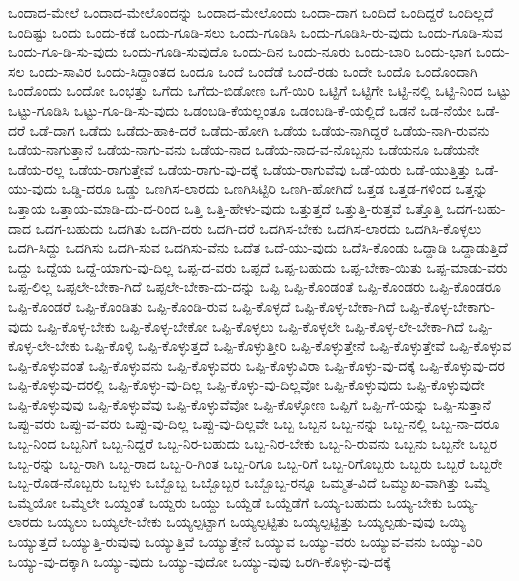 {ಒಂದಾದ-ಮೇಲೆ
ಒಂದಾದ-ಮೇಲೊಂದನ್ನು
ಒಂದಾದ-ಮೇಲೊಂದು
ಒಂದಾ-ದಾಗ
ಒಂದಿದೆ
ಒಂದಿದ್ದರೆ
ಒಂದಿಲ್ಲದೆ
ಒಂದಿಷ್ಟು
ಒಂದು
ಒಂದು-ಕಡೆ
ಒಂದು-ಗೂಡಿ-ಸಲು
ಒಂದು-ಗೂಡಿಸಿ
ಒಂದು-ಗೂಡಿಸಿ-ರು-ವುದು
ಒಂದು-ಗೂಡಿ-ಸುವ
ಒಂದು-ಗೂ-ಡಿ-ಸು-ವುದು
ಒಂದು-ಗೂಡಿ-ಸುವುದೊ
ಒಂದು-ದಿನ
ಒಂದು-ನೂರು
ಒಂದು-ಬಾರಿ
ಒಂದು-ಭಾಗ
ಒಂದು-ಸಲ
ಒಂದು-ಸಾವಿರ
ಒಂದು-ಸಿದ್ದಾಂತದ
ಒಂದೂ
ಒಂದೆ
ಒಂದೆಡೆ
ಒಂದೆ-ರಡು
ಒಂದೇ
ಒಂದೊ
ಒಂದೊಂದಾಗಿ
ಒಂದೊಂದು
ಒಂದೋ
ಒಂಭತ್ತು
ಒಗೆದು
ಒಗೆದು-ಬಿಡೋಣ
ಒಗೆ-ಯಿರಿ
ಒಟ್ಟಿಗೆ
ಒಟ್ಟಿಗೇ
ಒಟ್ಟಿ-ನಲ್ಲಿ
ಒಟ್ಟಿ-ನಿಂದ
ಒಟ್ಟು
ಒಟ್ಟು-ಗೂಡಿಸಿ
ಒಟ್ಟು-ಗೂ-ಡಿ-ಸು-ವುದು
ಒಡಂಬಡಿ-ಕೆಯಲ್ಲಂತೂ
ಒಡಂಬಡಿ-ಕೆ-ಯಲ್ಲಿದೆ
ಒಡನೆ
ಒಡ-ನೆಯೇ
ಒಡೆ-ದರೆ
ಒಡೆ-ದಾಗ
ಒಡೆದು
ಒಡೆದು-ಹಾಕಿ-ದರೆ
ಒಡೆದು-ಹೋಗಿ
ಒಡೆಯ
ಒಡೆಯ-ನಾಗಿದ್ದರೆ
ಒಡೆಯ-ನಾಗಿ-ರುವನು
ಒಡೆಯ-ನಾಗುತ್ತಾನೆ
ಒಡೆಯ-ನಾಗು-ವನು
ಒಡೆಯ-ನಾದ
ಒಡೆಯ-ನಾದ-ವ-ನೊಬ್ಬನು
ಒಡೆಯನೂ
ಒಡೆಯನೇ
ಒಡೆಯ-ರಲ್ಲ
ಒಡೆಯ-ರಾಗುತ್ತೇವೆ
ಒಡೆಯ-ರಾಗು-ವು-ದಕ್ಕೆ
ಒಡೆಯ-ರಾಗುವೆವು
ಒಡೆ-ಯರು
ಒಡೆ-ಯುತ್ತಿತ್ತು
ಒಡೆ-ಯು-ವುದು
ಒಡ್ಡಿ-ದರೂ
ಒಡ್ಡು
ಒಣಗಿಸ-ಲಾರದು
ಒಣಗಿಸಿಟ್ಟಿರಿ
ಒಣಗಿ-ಹೋಗಿದೆ
ಒತ್ತಡ
ಒತ್ತಡ-ಗಳಿಂದ
ಒತ್ತನ್ನು
ಒತ್ತಾಯ
ಒತ್ತಾಯ-ಮಾಡಿ-ದು-ದ-ರಿಂದ
ಒತ್ತಿ
ಒತ್ತಿ-ಹೇಳು-ವುದು
ಒತ್ತುತ್ತದೆ
ಒತ್ತುತ್ತಿ-ರುತ್ತವೆ
ಒತ್ತೊತ್ತಿ
ಒದಗ-ಬಹು-ದಾದ
ಒದಗ-ಬಹುದು
ಒದಗಿತು
ಒದಗಿ-ದರು
ಒದಗಿ-ದರೆ
ಒದಗಿಸ-ಬೇಕು
ಒದಗಿಸ-ಲಾರದು
ಒದಗಿಸಿ-ಕೊಳ್ಳಲು
ಒದಗಿ-ಸಿದ್ದು
ಒದಗಿಸು
ಒದಗಿ-ಸುವ
ಒದಗಿಸು-ವೆನು
ಒದೆತ
ಒದೆ-ಯು-ವುದು
ಒದೆಸಿ-ಕೊಂಡು
ಒದ್ದಾಡಿ
ಒದ್ದಾಡುತ್ತಿದೆ
ಒದ್ದು
ಒದ್ದೆಯ
ಒದ್ದೆ-ಯಾಗು-ವು-ದಿಲ್ಲ
ಒಪ್ಪ-ದ-ವರು
ಒಪ್ಪದೆ
ಒಪ್ಪ-ಬಹುದು
ಒಪ್ಪ-ಬೇಕಾ-ಯಿತು
ಒಪ್ಪ-ಮಾಡು-ವರು
ಒಪ್ಪ-ಲಿಲ್ಲ
ಒಪ್ಪಲೇ-ಬೇಕಾ-ಗಿದೆ
ಒಪ್ಪಲೇ-ಬೇಕಾ-ದು-ದನ್ನು
ಒಪ್ಪಿ
ಒಪ್ಪಿ-ಕೊಂಡಂತೆ
ಒಪ್ಪಿ-ಕೊಂಡರು
ಒಪ್ಪಿ-ಕೊಂಡರೂ
ಒಪ್ಪಿ-ಕೊಂಡರೆ
ಒಪ್ಪಿ-ಕೊಂಡಿತು
ಒಪ್ಪಿ-ಕೊಂಡಿ-ರುವ
ಒಪ್ಪಿ-ಕೊಳ್ಳದೆ
ಒಪ್ಪಿ-ಕೊಳ್ಳ-ಬೇಕಾ-ಗಿದೆ
ಒಪ್ಪಿ-ಕೊಳ್ಳ-ಬೇಕಾಗು-ವುದು
ಒಪ್ಪಿ-ಕೊಳ್ಳ-ಬೇಕು
ಒಪ್ಪಿ-ಕೊಳ್ಳ-ಬೇಕೋ
ಒಪ್ಪಿ-ಕೊಳ್ಳಲು
ಒಪ್ಪಿ-ಕೊಳ್ಳಲೇ
ಒಪ್ಪಿ-ಕೊಳ್ಳ-ಲೇ-ಬೇಕಾ-ಗಿದೆ
ಒಪ್ಪಿ-ಕೊಳ್ಳ-ಲೇ-ಬೇಕು
ಒಪ್ಪಿ-ಕೊಳ್ಳಿ
ಒಪ್ಪಿ-ಕೊಳ್ಳುತ್ತದೆ
ಒಪ್ಪಿ-ಕೊಳ್ಳುತ್ತೀರಿ
ಒಪ್ಪಿ-ಕೊಳ್ಳುತ್ತೇನೆ
ಒಪ್ಪಿ-ಕೊಳ್ಳುತ್ತೇವೆ
ಒಪ್ಪಿ-ಕೊಳ್ಳುವ
ಒಪ್ಪಿ-ಕೊಳ್ಳುವಂತೆ
ಒಪ್ಪಿ-ಕೊಳ್ಳುವನು
ಒಪ್ಪಿ-ಕೊಳ್ಳುವರು
ಒಪ್ಪಿ-ಕೊಳ್ಳುವಿರಾ
ಒಪ್ಪಿ-ಕೊಳ್ಳು-ವು-ದಕ್ಕೆ
ಒಪ್ಪಿ-ಕೊಳ್ಳುವು-ದರ
ಒಪ್ಪಿ-ಕೊಳ್ಳುವು-ದರಲ್ಲಿ
ಒಪ್ಪಿ-ಕೊಳ್ಳು-ವು-ದಿಲ್ಲ
ಒಪ್ಪಿ-ಕೊಳ್ಳು-ವು-ದಿಲ್ಲವೋ
ಒಪ್ಪಿ-ಕೊಳ್ಳುವುದು
ಒಪ್ಪಿ-ಕೊಳ್ಳುವುದೇ
ಒಪ್ಪಿ-ಕೊಳ್ಳುವುವು
ಒಪ್ಪಿ-ಕೊಳ್ಳುವೆವು
ಒಪ್ಪಿ-ಕೊಳ್ಳುವೆವೋ
ಒಪ್ಪಿ-ಕೊಳ್ಳೋಣ
ಒಪ್ಪಿಗೆ
ಒಪ್ಪಿ-ಗೆ-ಯನ್ನು
ಒಪ್ಪಿ-ಸುತ್ತಾನೆ
ಒಪ್ಪು-ವರು
ಒಪ್ಪು-ವ-ವರು
ಒಪ್ಪು-ವು-ದಿಲ್ಲ
ಒಪ್ಪು-ವು-ದಿಲ್ಲವೇ
ಒಬ್ಬ
ಒಬ್ಬನ
ಒಬ್ಬ-ನನ್ನು
ಒಬ್ಬ-ನಲ್ಲಿ
ಒಬ್ಬ-ನಾ-ದರೂ
ಒಬ್ಬ-ನಿಂದ
ಒಬ್ಬನಿಗೆ
ಒಬ್ಬ-ನಿದ್ದರೆ
ಒಬ್ಬ-ನಿರ-ಬಹುದು
ಒಬ್ಬ-ನಿರ-ಬೇಕು
ಒಬ್ಬ-ನಿ-ರುವನು
ಒಬ್ಬನು
ಒಬ್ಬನೇ
ಒಬ್ಬರ
ಒಬ್ಬ-ರನ್ನು
ಒಬ್ಬ-ರಾಗಿ
ಒಬ್ಬ-ರಾದ
ಒಬ್ಬ-ರಿ-ಗಿಂತ
ಒಬ್ಬ-ರಿಗೂ
ಒಬ್ಬ-ರಿಗೆ
ಒಬ್ಬ-ರಿಗೊಬ್ಬರು
ಒಬ್ಬರು
ಒಬ್ಬರೆ
ಒಬ್ಬರೇ
ಒಬ್ಬ-ರೊಡ-ನೊಬ್ಬರು
ಒಬ್ಬಳು
ಒಬ್ಬೊಬ್ಬ
ಒಬ್ಬೊಬ್ಬರ
ಒಬ್ಬೊಬ್ಬ-ರನ್ನೂ
ಒಮ್ಮತ-ವಿದೆ
ಒಮ್ಮುಖ-ವಾಗಿತ್ತು
ಒಮ್ಮೆ
ಒಮ್ಮೆಯೋ
ಒಮ್ಮೆಲೇ
ಒಯ್ದಂತೆ
ಒಯ್ದರು
ಒಯ್ದು
ಒಯ್ದೆಡೆ
ಒಯ್ದೆಡೆಗೆ
ಒಯ್ಯ-ಬಹುದು
ಒಯ್ಯ-ಬೇಕು
ಒಯ್ಯ-ಲಾರದು
ಒಯ್ಯಲು
ಒಯ್ಯಲೇ-ಬೇಕು
ಒಯ್ಯಲ್ಪಟ್ಟಾಗ
ಒಯ್ಯಲ್ಪಟ್ಟಿತು
ಒಯ್ಯಲ್ಪಟ್ಟಿತ್ತು
ಒಯ್ಯಲ್ಪಡು-ವುವು
ಒಯ್ಯಿ
ಒಯ್ಯುತ್ತದೆ
ಒಯ್ಯುತ್ತಿ-ರುವುವು
ಒಯ್ಯುತ್ತಿವೆ
ಒಯ್ಯುತ್ತೇನೆ
ಒಯ್ಯುವ
ಒಯ್ಯು-ವರು
ಒಯ್ಯುವ-ವನು
ಒಯ್ಯು-ವಿರಿ
ಒಯ್ಯು-ವು-ದಕ್ಕಾಗಿ
ಒಯ್ಯು-ವುದು
ಒಯ್ಯು-ವುದೋ
ಒಯ್ಯು-ವುವು
ಒರಗಿ-ಕೊಳ್ಳು-ವು-ದಕ್ಕೆ
}
